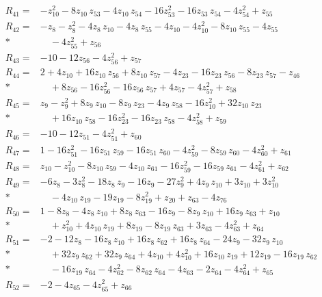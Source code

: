 \begin{align*}
R_{41}={}& -z_{10}^{2} - 8z_{10}\,z_{53} - 4z_{10}\,z_{54} - 16z_{53}^{2} - 16z_{53}\,z_{54} - 4z_{54}^{2} + z_{55} \\[2pt]
R_{42}={}& -z_{8} - z_{8}^{2} - 4z_{8}\,z_{10} - 4z_{8}\,z_{55} - 4z_{10} - 4z_{10}^{2} - 8z_{10}\,z_{55} - 4z_{55} \\*
&\quad  - 4z_{55}^{2} + z_{56} \\[2pt]
R_{43}={}& -10 - 12z_{56} - 4z_{56}^{2} + z_{57} \\[2pt]
R_{44}={}& 2 + 4z_{10} + 16z_{10}\,z_{56} + 8z_{10}\,z_{57} - 4z_{23} - 16z_{23}\,z_{56} - 8z_{23}\,z_{57} - z_{46} \\*
&\quad  + 8z_{56} - 16z_{56}^{2} - 16z_{56}\,z_{57} + 4z_{57} - 4z_{57}^{2} + z_{58} \\[2pt]
R_{45}={}& z_{9} - z_{9}^{2} + 8z_{9}\,z_{10} - 8z_{9}\,z_{23} - 4z_{9}\,z_{58} - 16z_{10}^{2} + 32z_{10}\,z_{23} \\*
&\quad  + 16z_{10}\,z_{58} - 16z_{23}^{2} - 16z_{23}\,z_{58} - 4z_{58}^{2} + z_{59} \\[2pt]
R_{46}={}& -10 - 12z_{51} - 4z_{51}^{2} + z_{60} \\[2pt]
R_{47}={}& 1 - 16z_{51}^{2} - 16z_{51}\,z_{59} - 16z_{51}\,z_{60} - 4z_{59}^{2} - 8z_{59}\,z_{60} - 4z_{60}^{2} + z_{61} \\[2pt]
R_{48}={}& z_{10} - z_{10}^{2} - 8z_{10}\,z_{59} - 4z_{10}\,z_{61} - 16z_{59}^{2} - 16z_{59}\,z_{61} - 4z_{61}^{2} + z_{62} \\[2pt]
R_{49}={}& -6z_{8} - 3z_{8}^{2} - 18z_{8}\,z_{9} - 16z_{9} - 27z_{9}^{2} + 4z_{9}\,z_{10} + 3z_{10} + 3z_{10}^{2} \\*
&\quad  - 4z_{10}\,z_{19} - 19z_{19} - 8z_{19}^{2} + z_{20} + z_{63} - 4z_{76} \\[2pt]
R_{50}={}& 1 - 8z_{8} - 4z_{8}\,z_{10} + 8z_{8}\,z_{63} - 16z_{9} - 8z_{9}\,z_{10} + 16z_{9}\,z_{63} + z_{10} \\*
&\quad  + z_{10}^{2} + 4z_{10}\,z_{19} + 8z_{19} - 8z_{19}\,z_{63} + 3z_{63} - 4z_{63}^{2} + z_{64} \\[2pt]
R_{51}={}& -2 - 12z_{8} - 16z_{8}\,z_{10} + 16z_{8}\,z_{62} + 16z_{8}\,z_{64} - 24z_{9} - 32z_{9}\,z_{10} \\*
&\quad  + 32z_{9}\,z_{62} + 32z_{9}\,z_{64} + 4z_{10} + 4z_{10}^{2} + 16z_{10}\,z_{19} + 12z_{19} - 16z_{19}\,z_{62} \\*
&\quad  - 16z_{19}\,z_{64} - 4z_{62}^{2} - 8z_{62}\,z_{64} - 4z_{63} - 2z_{64} - 4z_{64}^{2} + z_{65} \\[2pt]
R_{52}={}& -2 - 4z_{65} - 4z_{65}^{2} + z_{66} \\[2pt]

\end{align*}

